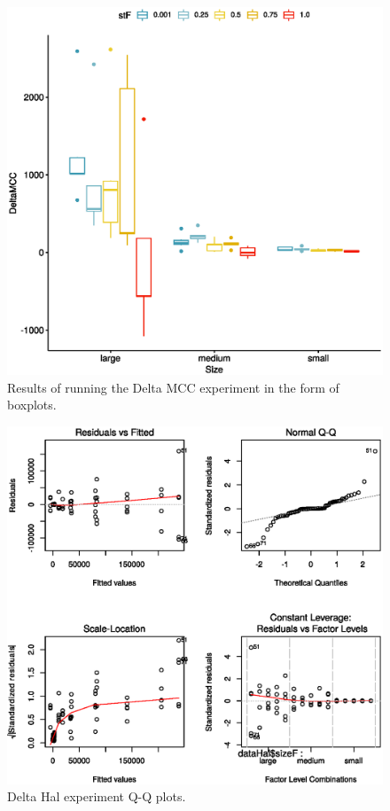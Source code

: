 \documentclass[conference]{IEEEtran}
\begin{document}
\begin{figure}
\hypertarget{fig:mcc_box}{%
\centering
\includegraphics{images/paper/results/mcc_box.eps}
\caption{Results of running the Delta MCC experiment in the form of
boxplots.}\label{fig:mcc_box}
}
\end{figure}

\begin{figure}
\hypertarget{fig:ex1_qqplots}{%
\centering
\includegraphics{images/paper/results/ex1_qqplots.eps}
\caption{Delta Hal experiment Q-Q plots.}\label{fig:ex1_qqplots}
}
\end{figure}
\end{document}
